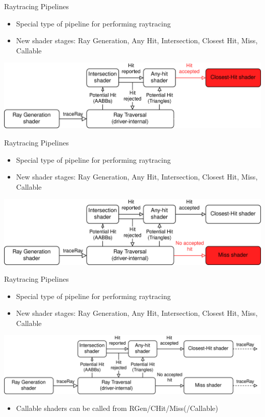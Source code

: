 \documentclass[aspectratio=169,t]{beamer}
\begin{document}
\begin{slide}{Raytracing Pipelines}
    \begin{itemize}
     \item Special type of pipeline for performing raytracing
     \item New shader stages: Ray Generation, Any Hit, Intersection, Closest Hit, Miss, Callable
    \end{itemize}
    \includegraphics[width=0.95\linewidth]{graphics/RTStages7.png}
\end{slide}

\begin{slide}{Raytracing Pipelines}
    \begin{itemize}
     \item Special type of pipeline for performing raytracing
     \item New shader stages: Ray Generation, Any Hit, Intersection, Closest Hit, Miss, Callable
    \end{itemize}
    \includegraphics[width=0.95\linewidth]{graphics/RTStages8.png}
\end{slide}

\begin{slide}{Raytracing Pipelines}
    \begin{itemize}
     \item Special type of pipeline for performing raytracing
     \item New shader stages: Ray Generation, Any Hit, Intersection, Closest Hit, Miss, Callable
    \end{itemize}
    \includegraphics[width=1.0651\linewidth]{./graphics/RTStages9.png}
    \pause
    \begin{itemize}
    \item Callable shaders can be called from RGen/CHit/Miss(/Callable)
    \end{itemize}
\end{slide}
\end{document}
